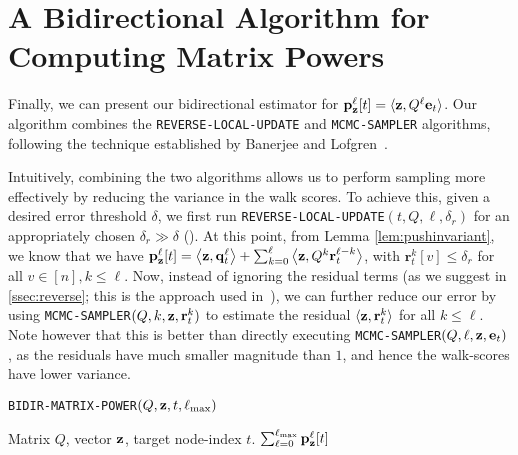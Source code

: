 
\section{A Bidirectional Algorithm for Computing Matrix Powers}
\label{ssec:bidiralgo}

Finally, we can present our bidirectional estimator for ${\mathbf{p}}_\mathbf{z}^{\ell}[t] = \langle\mathbf{z},Q^{\ell}\mathbf{e}_t\rangle$. 
Our algorithm combines the \texttt{REVERSE-LOCAL-UPDATE} and \texttt{MCMC-SAMPLER} algorithms, following the technique established by Banerjee and Lofgren~\cite{banerjee2015fast}. 

Intuitively, combining the two algorithms allows us to perform sampling more effectively by reducing the variance in the walk scores.
To achieve this, given a desired error threshold $\delta$, we first run \texttt{REVERSE-LOCAL-UPDATE}$(t,Q,\ell,\delta_r)$ for an appropriately chosen $\delta_r\gg\delta$ (). 
At this point, from Lemma \ref{lem:pushinvariant}, we know that we have
${\mathbf{p}}_\mathbf{z}^{\ell}[t] = \left< \mathbf{z}, \mathbf{q}_t^{\ell} \right> + \sum_{k=0}^{\ell} \left<\mathbf{z}, Q^k\mathbf{r}_t^{\ell-k}\right>$, with $\mathbf{r}_t^{k}[v]\leq\delta_r$ for all $v\in[n],k\leq\ell$.
Now, instead of ignoring the residual terms (as we suggest in \ref{ssec:reverse}; this is the approach used in~\cite{andersen2007local,lee2014asynchronous}), we can further reduce our error by using \texttt{MCMC-SAMPLER}$(Q,k,\mathbf{z},\mathbf{r}_t^k)$ to estimate the residual $\langle\mathbf{z},\mathbf{r}_t^k\rangle$ for all $k\leq\ell$.
Note however that this is better than directly executing \texttt{MCMC-SAMPLER}$(Q,\ell,\mathbf{z},\mathbf{e}_{t})$, as the residuals have much smaller magnitude than $1$, and hence the walk-scores have lower variance.
\begin{algorithm}[ht]
\caption{\texttt{BIDIR-MATRIX-POWER}$(Q, \mathbf{z}, t,\ell_{\max})$}
\label{alg:linearsysest}
\begin{algorithmic}[1]
\REQUIRE Matrix $Q$, vector $\mathbf{z}$, target node-index $t$.
\ENDFOR
{}
\ENDFOR
\RETURN $\sum_{\ell=0}^{\ell_{\max}} {\mathbf{p}}_\mathbf{z}^{\ell}[t]$ 
\end{algorithmic}
\end{algorithm} 

